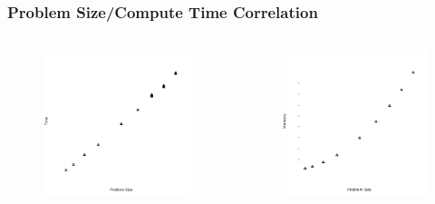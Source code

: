 \begin{frame}
	\frametitle{Problem Size/Compute Time Correlation}
		\begin{columns}[c] 

			\begin{figure}
					\includegraphics[width=0.85\linewidth]{figures/time/linpack}
			\end{figure}

			\begin{figure}
			\includegraphics[width=0.85\linewidth]{figures/memory/linpack}
			\end{figure}
		\end{columns}
\end{frame}

